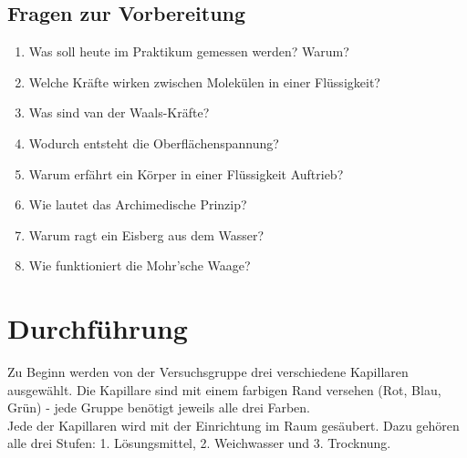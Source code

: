 \begin{tutorhint}
\section{Fragen zur Vorbereitung}

\begin{enumerate} 
 \item Was soll heute im Praktikum gemessen werden? Warum?
 \item Welche Kräfte wirken zwischen Molekülen in einer Flüssigkeit?
 \item Was sind van der Waals-Kräfte?
 \item Wodurch entsteht die Oberflächenspannung?
 \item Warum erfährt ein Körper in einer Flüssigkeit Auftrieb?
 \item Wie lautet das Archimedische Prinzip?
 \item Warum ragt ein Eisberg aus dem Wasser?
 \item Wie funktioniert die Mohr'sche Waage?
\end{enumerate} 
\end{tutorhint}

\section{Durchführung} 

Zu Beginn werden von der Versuchsgruppe drei verschiedene Kapillaren ausgewählt. Die Kapillare sind mit einem farbigen Rand versehen (Rot, Blau, Grün) - jede Gruppe benötigt jeweils alle drei Farben.\\

Jede der Kapillaren wird mit der Einrichtung im Raum gesäubert. Dazu gehören alle drei Stufen: 1. Lösungsmittel, 2. Weichwasser und 3. Trocknung.

